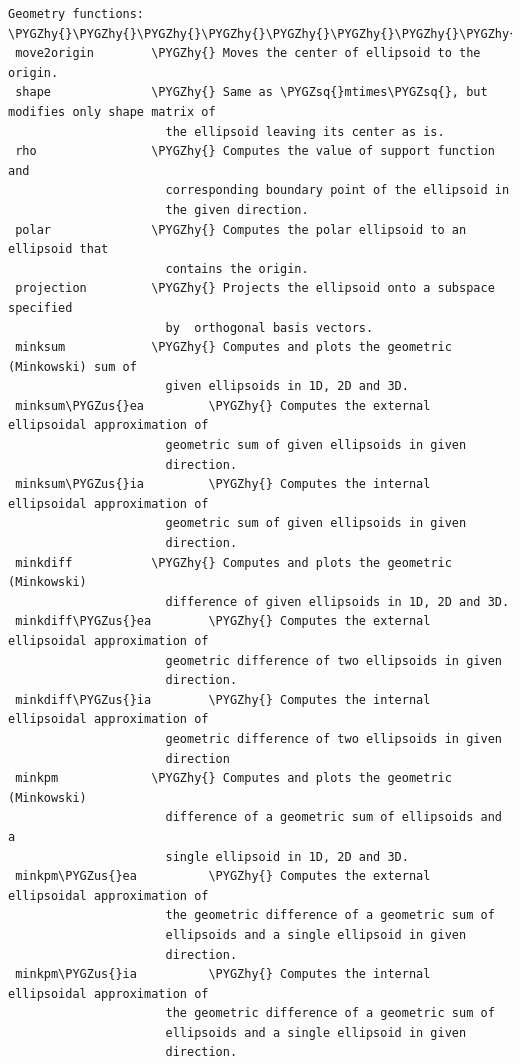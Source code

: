 \documentclass[letterpaper,10pt,english]{sphinxmanual}
\def\PYGZus{\char`\_}
\def\PYGZhy{\char`\-}
\def\PYGZsq{\char`\'}
\begin{document}
\begin{Verbatim}[commandchars=\\\{\}]
Geometry functions:
\PYGZhy{}\PYGZhy{}\PYGZhy{}\PYGZhy{}\PYGZhy{}\PYGZhy{}\PYGZhy{}\PYGZhy{}\PYGZhy{}\PYGZhy{}\PYGZhy{}\PYGZhy{}\PYGZhy{}\PYGZhy{}\PYGZhy{}\PYGZhy{}\PYGZhy{}\PYGZhy{}\PYGZhy{}
 move2origin        \PYGZhy{} Moves the center of ellipsoid to the origin.
 shape              \PYGZhy{} Same as \PYGZsq{}mtimes\PYGZsq{}, but modifies only shape matrix of
                      the ellipsoid leaving its center as is.
 rho                \PYGZhy{} Computes the value of support function and
                      corresponding boundary point of the ellipsoid in
                      the given direction.
 polar              \PYGZhy{} Computes the polar ellipsoid to an ellipsoid that
                      contains the origin.
 projection         \PYGZhy{} Projects the ellipsoid onto a subspace specified
                      by  orthogonal basis vectors.
 minksum            \PYGZhy{} Computes and plots the geometric (Minkowski) sum of
                      given ellipsoids in 1D, 2D and 3D.
 minksum\PYGZus{}ea         \PYGZhy{} Computes the external ellipsoidal approximation of
                      geometric sum of given ellipsoids in given
                      direction.
 minksum\PYGZus{}ia         \PYGZhy{} Computes the internal ellipsoidal approximation of
                      geometric sum of given ellipsoids in given
                      direction.
 minkdiff           \PYGZhy{} Computes and plots the geometric (Minkowski)
                      difference of given ellipsoids in 1D, 2D and 3D.
 minkdiff\PYGZus{}ea        \PYGZhy{} Computes the external ellipsoidal approximation of
                      geometric difference of two ellipsoids in given
                      direction.
 minkdiff\PYGZus{}ia        \PYGZhy{} Computes the internal ellipsoidal approximation of
                      geometric difference of two ellipsoids in given
                      direction
 minkpm             \PYGZhy{} Computes and plots the geometric (Minkowski)
                      difference of a geometric sum of ellipsoids and a
                      single ellipsoid in 1D, 2D and 3D.
 minkpm\PYGZus{}ea          \PYGZhy{} Computes the external ellipsoidal approximation of
                      the geometric difference of a geometric sum of
                      ellipsoids and a single ellipsoid in given
                      direction.
 minkpm\PYGZus{}ia          \PYGZhy{} Computes the internal ellipsoidal approximation of
                      the geometric difference of a geometric sum of
                      ellipsoids and a single ellipsoid in given
                      direction.

\end{Verbatim}
\end{document}
